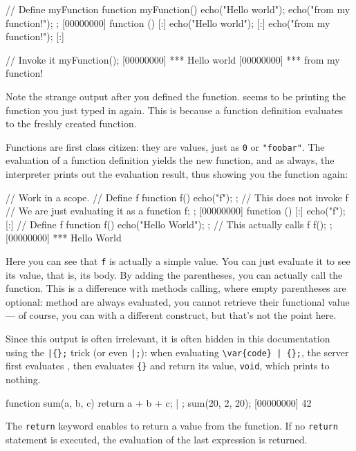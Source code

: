 \begin{urbiscript}
// Define myFunction
function myFunction()
{
  echo("Hello world");
  echo("from my function!");
};
[00000000] function () {
[:]  echo("Hello world");
[:]  echo("from my function!");
[:]}

// Invoke it
myFunction();
[00000000] *** Hello world
[00000000] *** from my function!
\end{urbiscript}

Note the strange output after you defined the function. \us seems to
be printing the function you just typed in again. This is because
a function definition evaluates to the freshly created function.

Functions are first class citizen: they are values, just as
\lstinline{0} or \lstinline{"foobar"}.  The evaluation of a function
definition yields the new function, and as always, the interpreter
prints out the evaluation result, thus showing you the function
again:

\begin{urbiscript}
// Work in a scope.
{
  // Define f
  function f()
  {
    echo("f");
  };
  // This does not invoke f
  // We are just evaluating it as a function
  f;
};
[00000000] function () {
[:]  echo("f");
[:]}
{
  // Define f
  function f()
  {
    echo("Hello World");
  };
  // This actually calls f
  f();
};
[00000000] *** Hello World
\end{urbiscript}

Here you can see that \lstinline{f} is actually a simple value. You can just
evaluate it to see its value, that is, its body. By adding the
parentheses, you can actually call the function. This is a difference
with methods calling, where empty parentheses are optional: method are
always evaluated, you cannot retrieve their functional value --- of
course, you can with a different construct, but that's not the point
here.

Since this output is often irrelevant, it is often hidden in this
documentation using the \lstinline'|{};' trick (or even
\lstinline'|;'): when evaluating \lstinline'\var{code} | {};', the
server first evaluates , then evaluates \lstinline'{}' and
return its value, \lstinline'void', which prints to nothing.

\begin{urbiscript}
function sum(a, b, c)
{
  return a + b + c;
} | {};
sum(20, 2, 20);
[00000000] 42
\end{urbiscript}

The \lstinline{return} keyword enables to return a value from the
function. If no \lstinline{return} statement is executed, the
evaluation of the last expression is returned.

